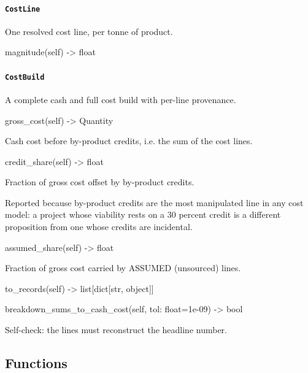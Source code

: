 \documentclass[10pt,a4paper,twoside]{report}
\begin{document}
\paragraph{\texttt{CostLine}}

One resolved cost line, per tonne of product.

\begin{verbatimsmall}
magnitude(self) -> float
\end{verbatimsmall}

\paragraph{\texttt{CostBuild}}

A complete cash and full cost build with per-line provenance.

\begin{verbatimsmall}
gross_cost(self) -> Quantity
\end{verbatimsmall}

Cash cost before by-product credits, i.e. the sum of the cost lines.

\begin{verbatimsmall}
credit_share(self) -> float
\end{verbatimsmall}

Fraction of gross cost offset by by-product credits.

Reported because by-product credits are the most manipulated line in any cost model: a project whose viability rests on a 30 percent credit is a different proposition from one whose credits are incidental.

\begin{verbatimsmall}
assumed_share(self) -> float
\end{verbatimsmall}

Fraction of gross cost carried by ASSUMED (unsourced) lines.

\begin{verbatimsmall}
to_records(self) -> list[dict[str, object]]
\end{verbatimsmall}

\begin{verbatimsmall}
breakdown_sums_to_cash_cost(self, tol: float=1e-09) -> bool
\end{verbatimsmall}

Self-check: the lines must reconstruct the headline number.

\subsection*{Functions}
\end{document}
